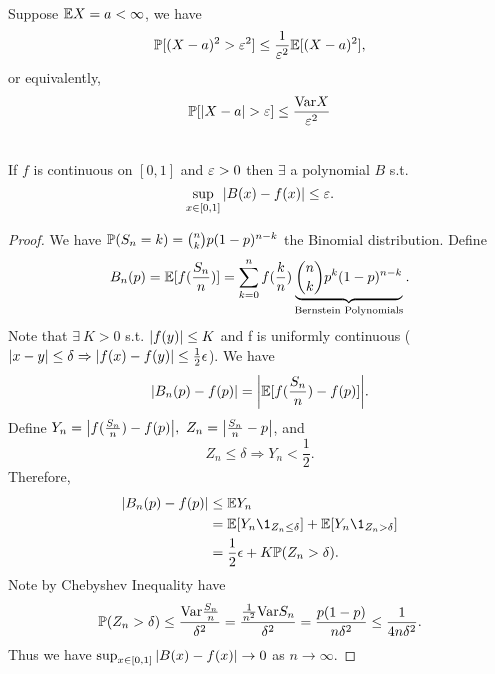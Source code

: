 \begin{proposition}\ \\
Suppose $\E X = a < \infty$, we have
\begin{equation*}
    \P[(X - a)^2 > \vep^2] \leq \frac{1}{\vep^2} \E[(X-a)^2],
\end{equation*}
or equivalently,
\begin{equation*}
    \P[\abs{X - a} > \vep] \leq \frac{\Var{X}}{\vep^2}
\end{equation*}
\end{proposition}


\vspace{6pt}
\begin{theorem}\ \\
If $f$ is continuous on $[0,1]$ and $\vep > 0$ then $\exists$ a polynomial $B$ s.t.
\begin{equation*}
    \sup_{x \in [0,1]} \abs{B(x) - f(x)} \leq \vep.
\end{equation*}
\end{theorem}
\begin{proof}
We have $\P(S_n = k) = \binom{n}{k}p (1 - p)^{n - k}$ the Binomial distribution. Define
\begin{equation*}
    B_n(p) = \E[f(\frac{S_n}{n})] = \sum_{k = 0}^n f(\frac{k}{n}) \underbrace{\binom{n}{k} p^k (1 - p)^{n - k}}_{\text{Bernstein Polynomials}}.
\end{equation*}
Note that $\exists\ K > 0$ s.t. $\abs{f(y)} \leq K$ and f is uniformly continuous ($\abs{x - y} \leq \delta \Rightarrow \abs{f(x) - f(y)} \leq \frac{1}{2} \ep$). We have
\begin{align*}
    \abs{B_n(p) - f(p)} = \abs{\E[f(\frac{S_n}{n}) - f(p)]}.
\end{align*}
Define $Y_n = \abs{f(\frac{S_n}{n}) - f(p)},\ Z_n = \abs{\frac{S_n}{n} - p}$, and
\begin{equation*}
    Z_n \leq \delta \Rightarrow Y_n < \frac{1}{2}.
\end{equation*}
Therefore,
\begin{align*}
    \abs{B_n(p) - f(p)} &\leq \E Y_n\\
    &= \E[Y_n \1_{Z_n \leq \delta}] + \E[Y_n \1_{Z_n > \delta}]\\
    &= \frac{1}{2} \ep + K \P(Z_n > \delta).
\end{align*}
Note by Chebyshev Inequality have
\begin{equation*}
    \P(Z_n > \delta) \leq \frac{\Var{\frac{S_n}{n}}}{\delta^2} = \frac{\frac{1}{n^2} \Var{S_n}}{\delta^2} = \frac{p(1 - p)}{n \delta^2} \leq \frac{1}{4n\delta^2}.
\end{equation*}
Thus we have $ \sup_{x \in [0,1]} \abs{B(x) - f(x)} \to 0$ as $n \to \infty$.
\end{proof}











